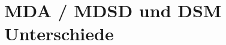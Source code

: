 \documentclass[11pt,english,ngerman, headsepline]{scrreprt}
\begin{document}
\chapter{MDA / MDSD und DSM Unterschiede} 
%  
%  
%  
%  
%   
\end{document}
